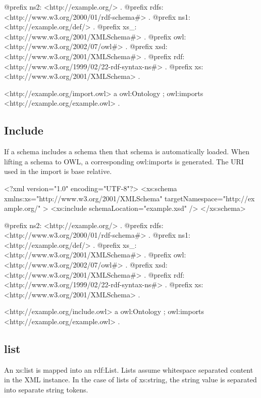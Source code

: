 \begin{DoxyCodeInclude}
@prefix ns2:     <http://example.org/> .
@prefix rdfs:    <http://www.w3.org/2000/01/rdf-schema#> .
@prefix ns1:     <http://example.org/def/> .
@prefix xs_:     <http://www.w3.org/2001/XMLSchema#> .
@prefix owl:     <http://www.w3.org/2002/07/owl#> .
@prefix xsd:     <http://www.w3.org/2001/XMLSchema#> .
@prefix rdf:     <http://www.w3.org/1999/02/22-rdf-syntax-ns#> .
@prefix xs:      <http://www.w3.org/2001/XMLSchema> .

<http://example.org/import.owl>
      a       owl:Ontology ;
      owl:imports <http://example.org/example.owl> .
\end{DoxyCodeInclude}
 \hypertarget{include}{}\subsection{Include}\label{include}
If a schema includes a schema then that schema is automatically loaded. When lifting a schema to OWL, a corresponding owl:imports is generated. The URI used in the import is base relative.


\begin{DoxyCodeInclude}
<?xml version="1.0" encoding="UTF-8"?>
<xs:schema xmlns:xs="http://www.w3.org/2001/XMLSchema" targetNamespace="http://ex
      ample.org/" >
        <xs:include schemaLocation="example.xsd" />
</xs:schema>
\end{DoxyCodeInclude}
 
\begin{DoxyCodeInclude}
@prefix ns2:     <http://example.org/> .
@prefix rdfs:    <http://www.w3.org/2000/01/rdf-schema#> .
@prefix ns1:     <http://example.org/def/> .
@prefix xs_:     <http://www.w3.org/2001/XMLSchema#> .
@prefix owl:     <http://www.w3.org/2002/07/owl#> .
@prefix xsd:     <http://www.w3.org/2001/XMLSchema#> .
@prefix rdf:     <http://www.w3.org/1999/02/22-rdf-syntax-ns#> .
@prefix xs:      <http://www.w3.org/2001/XMLSchema> .

<http://example.org/include.owl>
      a       owl:Ontology ;
      owl:imports <http://example.org/example.owl> .
\end{DoxyCodeInclude}
 \hypertarget{list}{}\subsection{list}\label{list}
An xs:list is mapped into an rdf:List. Lists assume whitespace separated content in the XML instance. In the case of lists of xs:string, the string value is separated into separate string tokens.


